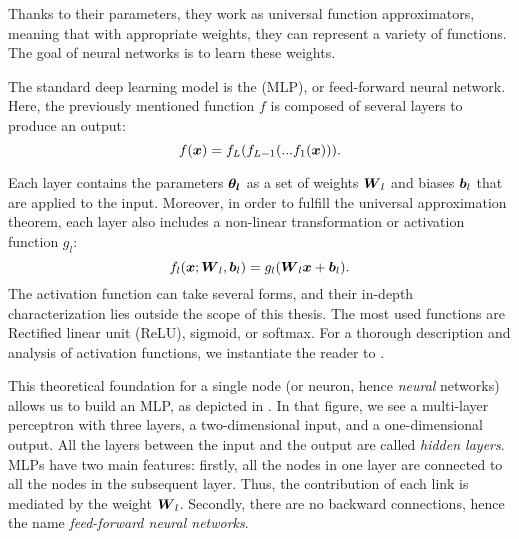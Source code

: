 Thanks to their parameters, they work as universal function approximators, meaning that with appropriate weights, they can represent a variety of functions. The goal of neural networks is to learn these weights.

The standard deep learning model is the  (MLP), or feed-forward neural network. Here, the previously mentioned function $f$ is composed of several layers to produce an output:
\begin{equation*}
    f(\boldsymbol{x}) = f_L(f_{L-1}(...f_1(\boldsymbol{x}))).
\end{equation*}

Each layer contains the parameters $\boldsymbol{\theta_l}$ as a set of weights $\boldsymbol{W}_l$ and biases $\boldsymbol{b}_l$ that are applied to the input. Moreover, in order to fulfill the universal approximation theorem, each layer also includes a non-linear transformation or activation function $g_l$:
\begin{equation*}
    f_l(\boldsymbol{x};\boldsymbol{W}_l,\boldsymbol{b}_l) = {g_l}(\boldsymbol{W}_l\boldsymbol{x} + \boldsymbol{b}_l).
\end{equation*}
The activation function can take several forms, and their in-depth characterization lies outside the scope of this thesis. The most used functions are Rectified linear unit (ReLU), sigmoid, or softmax. For a thorough description and analysis of activation functions, we instantiate the reader to .


This theoretical foundation for a single node (or neuron, hence \textit{neural} networks) allows us to build an MLP, as depicted in . In that figure, we see a multi-layer perceptron with three layers, a two-dimensional input, and a one-dimensional output. All the layers between the input and the output are called \textit{hidden layers}. MLPs have two main features: firstly, all the nodes in one layer are connected to all the nodes in the subsequent layer. Thus, the contribution of each link is mediated by the weight $\boldsymbol{W}_l$. Secondly, there are no backward connections, hence the name \textit{feed-forward neural networks}.


